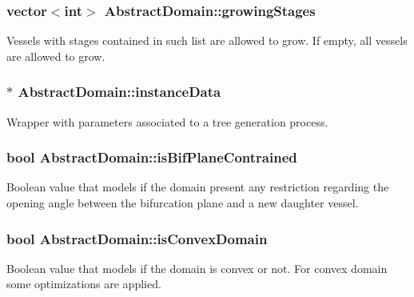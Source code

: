 \subsubsection[{\texorpdfstring{growing\+Stages}{growingStages}}]{\setlength{\rightskip}{0pt plus 5cm}vector$<$int$>$ Abstract\+Domain\+::growing\+Stages\hspace{0.3cm}{\ttfamily [protected]}}\hypertarget{class_abstract_domain_a765dfd145f6559fc26cc0a36f1bf034a}{}\label{class_abstract_domain_a765dfd145f6559fc26cc0a36f1bf034a}
Vessels with stages contained in such list are allowed to grow. If empty, all vessels are allowed to grow. 
\subsubsection[{\texorpdfstring{instance\+Data}{instanceData}}]{$\ast$ Abstract\+Domain\+::instance\+Data\hspace{0.3cm}{\ttfamily [protected]}}\hypertarget{class_abstract_domain_aa37fbabc2bfa92c574f7db7544016b53}{}\label{class_abstract_domain_aa37fbabc2bfa92c574f7db7544016b53}
Wrapper with parameters associated to a tree generation process. 
\subsubsection[{\texorpdfstring{is\+Bif\+Plane\+Contrained}{isBifPlaneContrained}}]{\setlength{\rightskip}{0pt plus 5cm}bool Abstract\+Domain\+::is\+Bif\+Plane\+Contrained\hspace{0.3cm}{\ttfamily [protected]}}\hypertarget{class_abstract_domain_a1b9397f6ac56e1a973d812498153be95}{}\label{class_abstract_domain_a1b9397f6ac56e1a973d812498153be95}
Boolean value that models if the domain present any restriction regarding the opening angle between the bifurcation plane and a new daughter vessel. 
\subsubsection[{\texorpdfstring{is\+Convex\+Domain}{isConvexDomain}}]{\setlength{\rightskip}{0pt plus 5cm}bool Abstract\+Domain\+::is\+Convex\+Domain\hspace{0.3cm}{\ttfamily [protected]}}\hypertarget{class_abstract_domain_acaa76f4d7e102e66b64d10cd652167c9}{}\label{class_abstract_domain_acaa76f4d7e102e66b64d10cd652167c9}
Boolean value that models if the domain is convex or not. For convex domain some optimizations are applied. 

